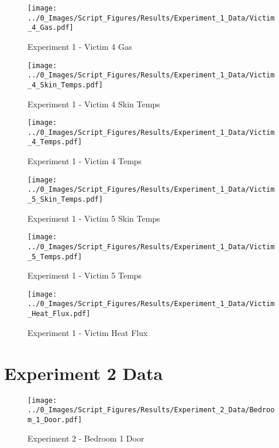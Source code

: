 	\begin{figure}[H]
		\centering
		\texttt{[image: ../0\_Images/Script\_Figures/Results/Experiment\_1\_Data/Victim\_4\_Gas.pdf]}
		\caption[]{Experiment 1 - Victim 4 Gas}
	\end{figure}
 
	\clearpage

	\begin{figure}[H]
		\centering
		\texttt{[image: ../0\_Images/Script\_Figures/Results/Experiment\_1\_Data/Victim\_4\_Skin\_Temps.pdf]}
		\caption[]{Experiment 1 - Victim 4 Skin Temps}
	\end{figure}
 

	\begin{figure}[H]
		\centering
		\texttt{[image: ../0\_Images/Script\_Figures/Results/Experiment\_1\_Data/Victim\_4\_Temps.pdf]}
		\caption[]{Experiment 1 - Victim 4 Temps}
	\end{figure}
 
	\clearpage

	\begin{figure}[H]
		\centering
		\texttt{[image: ../0\_Images/Script\_Figures/Results/Experiment\_1\_Data/Victim\_5\_Skin\_Temps.pdf]}
		\caption[]{Experiment 1 - Victim 5 Skin Temps}
	\end{figure}
 

	\begin{figure}[H]
		\centering
		\texttt{[image: ../0\_Images/Script\_Figures/Results/Experiment\_1\_Data/Victim\_5\_Temps.pdf]}
		\caption[]{Experiment 1 - Victim 5 Temps}
	\end{figure}
 
	\clearpage

	\begin{figure}[H]
		\centering
		\texttt{[image: ../0\_Images/Script\_Figures/Results/Experiment\_1\_Data/Victim\_Heat\_Flux.pdf]}
		\caption[]{Experiment 1 - Victim Heat Flux}
	\end{figure}
 

\clearpage		\large
\section{Experiment 2 Data} \label{App:Exp2Results} 

	\begin{figure}[H]
		\centering
		\texttt{[image: ../0\_Images/Script\_Figures/Results/Experiment\_2\_Data/Bedroom\_1\_Door.pdf]}
		\caption[]{Experiment 2 - Bedroom 1 Door}
	\end{figure}
 

